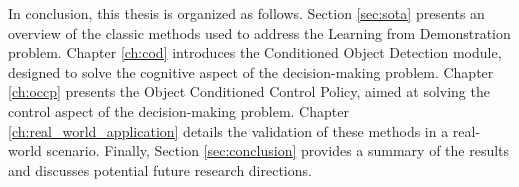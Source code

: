 In conclusion, this thesis is organized as follows. Section \ref{sec:sota} presents an overview of the classic methods used to address the Learning from Demonstration problem. Chapter \ref{ch:cod} introduces the Conditioned Object Detection module, designed to solve the cognitive aspect of the decision-making problem. Chapter \ref{ch:occp} presents the Object Conditioned Control Policy, aimed at solving the control aspect of the decision-making problem. Chapter \ref{ch:real_world_application} details the validation of these methods in a real-world scenario. Finally, Section \ref{sec:conclusion} provides a summary of the results and discusses potential future research directions.

